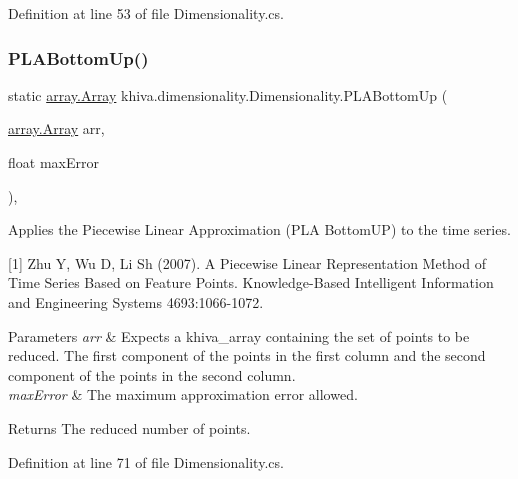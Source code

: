 Definition at line 53 of file Dimensionality.\+cs.

\mbox{\label{classkhiva_1_1dimensionality_1_1_dimensionality_aef75096686fdf86ead6ca02f6ce8b742}} 
\subsubsection{\texorpdfstring{P\+L\+A\+Bottom\+Up()}{PLABottomUp()}}
{\footnotesize\ttfamily static \mbox{\hyperlink{classkhiva_1_1array_1_1_array}{array.\+Array}} khiva.\+dimensionality.\+Dimensionality.\+P\+L\+A\+Bottom\+Up (\begin{DoxyParamCaption}\item[{\mbox{\hyperlink{classkhiva_1_1array_1_1_array}{array.\+Array}}}]{arr,  }\item[{float}]{max\+Error }\end{DoxyParamCaption})\hspace{0.3cm}{\ttfamily [inline]}, {\ttfamily [static]}}



Applies the Piecewise Linear Approximation (P\+LA Bottom\+UP) to the time series. 

\mbox{[}1\mbox{]} Zhu Y, Wu D, Li Sh (2007). A Piecewise Linear Representation Method of Time Series Based on Feature Points. Knowledge-\/\+Based Intelligent Information and Engineering Systems 4693\+:1066-\/1072. 


\begin{DoxyParams}{Parameters}
{\em arr} & Expects a khiva\+\_\+array containing the set of points to be reduced. The first component of the points in the first column and the second component of the points in the second column.\\
\hline
{\em max\+Error} & The maximum approximation error allowed.\\
\hline
\end{DoxyParams}
\begin{DoxyReturn}{Returns}
The reduced number of points.
\end{DoxyReturn}


Definition at line 71 of file Dimensionality.\+cs.

